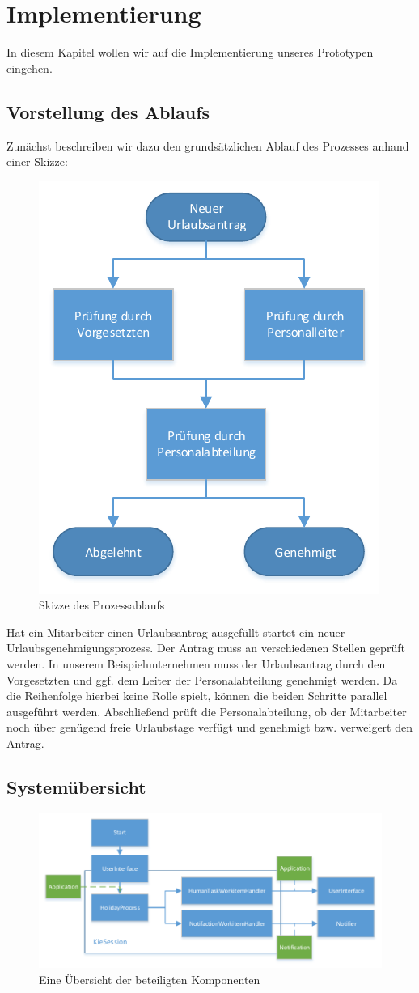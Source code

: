 \section{Implementierung}
In diesem Kapitel wollen wir auf die Implementierung unseres Prototypen eingehen.


\subsection{Vorstellung des Ablaufs}
Zunächst beschreiben wir dazu den grundsätzlichen Ablauf des Prozesses anhand einer Skizze:
\begin{figure}[H]
\centering
\includegraphics[width=0.5\linewidth]{Bilder/Workflow}
\caption{Skizze des Prozessablaufs}
\label{fig:Workflow}
\end{figure}

Hat ein Mitarbeiter einen Urlaubsantrag ausgefüllt startet ein neuer Urlaubsgenehmigungsprozess. Der Antrag muss an verschiedenen Stellen geprüft werden. In unserem Beispielunternehmen muss der Urlaubsantrag durch den Vorgesetzten und ggf. dem Leiter der Personalabteilung genehmigt werden. Da die Reihenfolge hierbei keine Rolle spielt, können die beiden Schritte parallel ausgeführt werden. Abschließend prüft die Personalabteilung, ob der Mitarbeiter noch über genügend freie Urlaubstage verfügt und genehmigt bzw. verweigert den Antrag.	
	
	
\subsection{Systemübersicht}

\begin{figure}[H]
\centering
\includegraphics[width=1.0\linewidth]{Bilder/Komponenten}
\caption{Eine Übersicht der beteiligten Komponenten}
\label{fig:Komponenten}
\end{figure}

